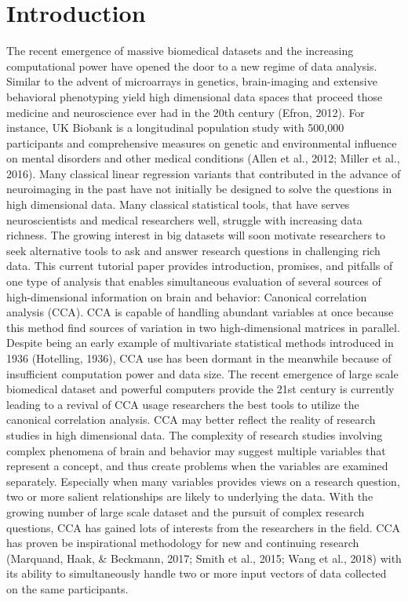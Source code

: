 \section{Introduction}
\label{ch2:intor}
The recent emergence of massive biomedical datasets and the increasing computational power have opened the door to a new regime of data analysis. Similar to the advent of microarrays in genetics, brain-imaging and extensive behavioral phenotyping yield high dimensional data spaces that proceed those medicine and neuroscience ever had in the 20th century (Efron, 2012). For instance, UK Biobank is a longitudinal population study with 500,000 participants and comprehensive measures on genetic and environmental influence on mental disorders and other medical conditions (Allen et al., 2012; Miller et al., 2016). Many classical linear regression variants that contributed in the advance of neuroimaging in the past have not initially be designed to solve the questions in high dimensional data. Many classical statistical tools, that have serves neuroscientists and medical researchers well, struggle with increasing data richness. The growing interest in big datasets will soon motivate researchers to seek alternative tools to ask and answer research questions in challenging rich data. 
This current tutorial paper provides introduction, promises, and pitfalls of one type of analysis that enables simultaneous evaluation of several sources of high-dimensional information on brain and behavior: Canonical correlation analysis (CCA). CCA is capable of handling abundant variables at once because this method find sources of variation in two high-dimensional matrices in parallel. Despite being an early example of multivariate statistical methods introduced in 1936 (Hotelling, 1936), CCA use has been dormant in the meanwhile because of insufficient computation power and data size. The recent emergence of large scale biomedical dataset and powerful computers provide the 21st century is currently leading to a revival of CCA usage researchers the best tools to utilize the canonical correlation analysis. CCA may better reflect the reality of research studies in high dimensional data. The complexity of research studies involving complex phenomena of brain and behavior may suggest multiple variables that represent a concept, and thus create problems when the variables are examined separately. Especially when many variables provides views on a research question, two or more salient relationships are likely to underlying the data. With the growing number of large scale dataset and the pursuit of complex research questions, CCA has gained lots of interests from the researchers in the field. CCA has proven be inspirational methodology for new and continuing research (Marquand, Haak, \& Beckmann, 2017; Smith et al., 2015; Wang et al., 2018) with its ability to simultaneously handle two or more input vectors of data collected on the same participants. 
